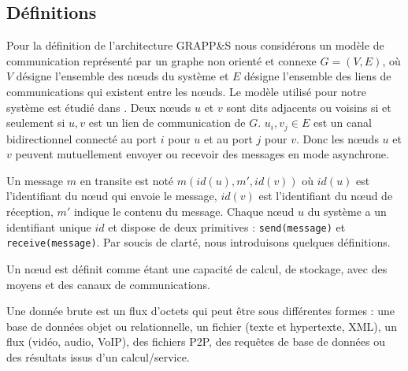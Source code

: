 \subsection{Définitions\label{sec:Definitions}}
Pour la définition de l'architecture GRAPP\&S nous considérons un modèle de communication représenté par un  graphe non orienté  et connexe $G = (V, E)$, où $V$  désigne  l'ensemble  des  nœuds  du système et $E$ désigne l'ensemble des liens de communications qui existent entre les nœuds. Le modèle utilisé pour notre système est étudié dans \cite{Chalopin06}. Deux nœuds $u$ et $v$ sont dits adjacents ou voisins si et seulement si ${u, v}$ est un lien de communication de $G$. ${u_i, v_j} \in E$ est un canal bidirectionnel connecté au port $i$ pour $u$ et au port $j$ pour $v$. Donc les nœuds $u$ et $v$ peuvent mutuellement envoyer ou recevoir des messages en mode asynchrone. 

Un message $m$ en transite est noté $m(id(u), m', id(v))$ où  $id(u)$  est  l'identifiant du nœud qui envoie le message, $id(v)$ est  l'identifiant du nœud de réception, $m'$ indique le contenu du message. Chaque nœud $u$ du système a un identifiant unique $id$ et  dispose de deux primitives : \texttt{send(message)} et \texttt{receive(message)}. Par soucis de clarté, nous introduisons quelques définitions.

\begin{definition}Un nœud  est  définit  comme  étant une  capacité de calcul, de stockage, avec  des moyens et des canaux de communications.\end{definition}
\begin{definition}Une donnée  brute  est  un flux  d’octets qui peut être  sous  différentes formes : une base de données objet ou  relationnelle, un fichier (texte et hypertexte, XML), un flux (vidéo, audio, VoIP), des fichiers P2P, des  requêtes  de  base  de données ou des résultats issus d'un calcul/service.\end{definition}

